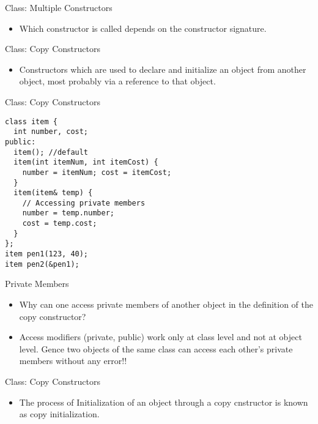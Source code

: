 \documentclass{beamer}
\begin{document}
\begin{frame}[fragile]{Class: Multiple Constructors}
  \begin{itemize}
  \item Which constructor is called depends on the constructor signature.
  \end{itemize}
\end{frame}

\begin{frame}[fragile]{Class: Copy Constructors}
  \begin{itemize}
  \item Constructors which are used to declare and initialize an object from another object, most probably via a reference to that object.
  \end{itemize}
\end{frame}

\begin{frame}[fragile]{Class: Copy Constructors}
  \begin{lstlisting}
class item {
  int number, cost;
public:
  item(); //default
  item(int itemNum, int itemCost) {
    number = itemNum; cost = itemCost;
  }
  item(item& temp) {
    // Accessing private members
    number = temp.number;
    cost = temp.cost;
  }
};
item pen1(123, 40);
item pen2(&pen1);
  \end{lstlisting}
\end{frame}

\begin{frame}[fragile]{Private Members}
  \begin{itemize}
  \item Why can one access private members of another object in the definition of the copy constructor?\pause
  \item Access modifiers (private, public) work only at class level and not at object level. Gence two objects of the same class can access each other's private members without any error!!
  \end{itemize}
\end{frame}

\begin{frame}[fragile]{Class: Copy Constructors}
  \begin{itemize}
  \item The process of Initialization of an object through a copy cnstructor is known as copy initialization.
  \end{itemize}
\end{frame}
\end{document}
